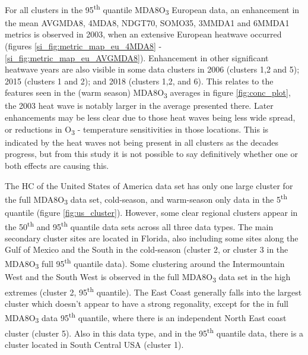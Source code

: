 \documentclass[journal abbreviation, manuscript]{copernicus}
\begin{document}
For all clusters in the 95\textsuperscript{th} quantile MDA8O\textsubscript{3} European data, an enhancement in the mean AVGMDA8, 4MDA8, NDGT70, SOMO35, 3MMDA1 and 6MMDA1 metrics is observed in 2003, when an extensive European heatwave occurred (figures \ref{si_fig:metric_map_eu_4MDA8} - \ref{si_fig:metric_map_eu_AVGMDA8}). Enhancement in other significant heatwave years are also visible in some data clusters in 2006 (clusters 1,2 and 5); 2015 (clusters 1 and 2); and 2018 (clusters 1,2, and 6). This relates to the features seen in the (warm season) MDA8O\textsubscript{3} averages in figure \ref{fig:conc_plot}, the 2003 heat wave is notably larger in the average presented there. Later enhancements may be less clear due to those heat waves being less wide spread, or reductions in O\textsubscript{3} - temperature sensitivities in those locations. This is indicated by the heat waves not being present in all clusters as the decades progress, but from this study it is not possible to say definitively whether one or both effects are causing this.

The HC of the United States of America data set has only one large cluster for the full MDA8O\textsubscript{3} data set, cold-season, and warm-season only data in the 5\textsuperscript{th} quantile (figure \ref{fig:us_cluster}). However, some clear regional clusters appear in the 50\textsuperscript{th} and 95\textsuperscript{th} quantile data sets across all three data types. The main secondary cluster sites are located in Florida, also including some sites along the Gulf of Mexico and the South in the cold-season (cluster 2, or cluster 3 in the MDA8O\textsubscript{3} full 95\textsuperscript{th} quantile data). Some clustering around the Intermountain West and the South West is observed in the full MDA8O\textsubscript{3} data set in the high extremes (cluster 2, 95\textsuperscript{th} quantile). The East Coast generally falls into the largest cluster which doesn't appear to have a strong regonality, except for the in full MDA8O\textsubscript{3} data 95\textsuperscript{th} quantile, where there is an independent North East coast cluster (cluster 5). Also in this data type, and in the 95\textsuperscript{th} quantile data, there is a cluster located in South Central USA (cluster 1).
\end{document}
